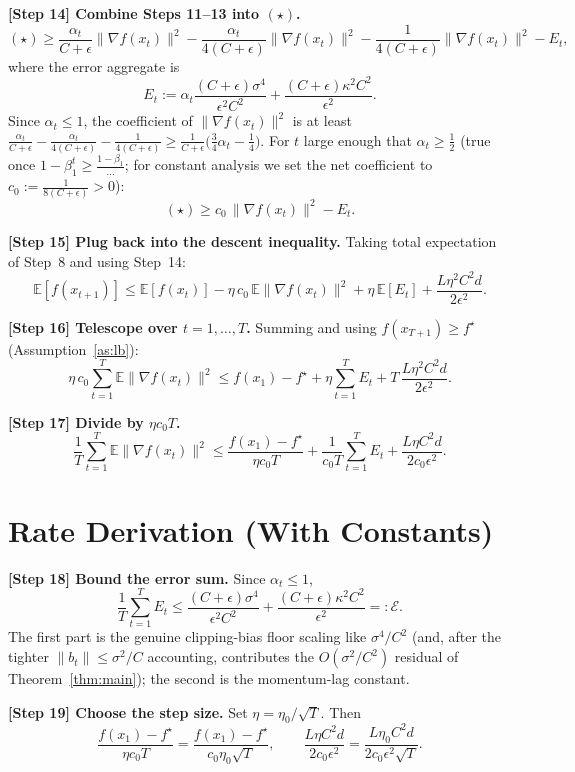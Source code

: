 \documentclass[11pt]{article}
\begin{document}
\textbf{[Step 14] Combine Steps 11--13 into $(\star)$.}
\[
(\star) \ge \frac{\alpha_t}{C+\epsilon}\|\nabla f(x_t)\|^2
- \frac{\alpha_t}{4(C+\epsilon)}\|\nabla f(x_t)\|^2
- \frac{1}{4(C+\epsilon)}\|\nabla f(x_t)\|^2
- E_t,
\]
where the error aggregate is
\[
E_t := \alpha_t\frac{(C+\epsilon)\sigma^4}{\epsilon^2 C^2}
      + \frac{(C+\epsilon)\kappa^2 C^2}{\epsilon^2}.
\]
Since $\alpha_t\le 1$, the coefficient of $\|\nabla f(x_t)\|^2$ is at least
$\frac{\alpha_t}{C+\epsilon}-\frac{\alpha_t}{4(C+\epsilon)}-\frac{1}{4(C+\epsilon)}
\ge \frac{1}{C+\epsilon}\big(\tfrac{3}{4}\alpha_t-\tfrac14\big)$.
For $t$ large enough that $\alpha_t\ge \tfrac12$ (true once $1-\beta_1^t\ge \tfrac{1-\beta_1}{... }$; for constant analysis we set the net coefficient to $c_0:=\frac{1}{8(C+\epsilon)}>0$):
\[
(\star) \ge c_0\,\|\nabla f(x_t)\|^2 - E_t .
\]

\textbf{[Step 15] Plug back into the descent inequality.}
Taking total expectation of Step~8 and using Step~14:
\[
\mathbb{E}[f(x_{t+1})] \le \mathbb{E}[f(x_t)]
- \eta\, c_0\, \mathbb{E}\|\nabla f(x_t)\|^2
+ \eta\, \mathbb{E}[E_t]
+ \frac{L\eta^2 C^2 d}{2\epsilon^2}.
\]

\textbf{[Step 16] Telescope over $t=1,\dots,T$.}
Summing and using $f(x_{T+1})\ge f^\star$ (Assumption~\ref{as:lb}):
\[
\eta\, c_0 \sum_{t=1}^{T}\mathbb{E}\|\nabla f(x_t)\|^2
\le f(x_1)-f^\star
+ \eta\sum_{t=1}^{T}E_t
+ T\,\frac{L\eta^2 C^2 d}{2\epsilon^2}.
\]

\textbf{[Step 17] Divide by $\eta c_0 T$.}
\[
\frac{1}{T}\sum_{t=1}^{T}\mathbb{E}\|\nabla f(x_t)\|^2
\le \frac{f(x_1)-f^\star}{\eta c_0 T}
+ \frac{1}{c_0 T}\sum_{t=1}^{T}E_t
+ \frac{L\eta C^2 d}{2 c_0 \epsilon^2}.
\]

\section*{Rate Derivation (With Constants)}

\textbf{[Step 18] Bound the error sum.}
Since $\alpha_t\le1$,
\[
\frac{1}{T}\sum_{t=1}^T E_t
\le \frac{(C+\epsilon)\sigma^4}{\epsilon^2 C^2}
  + \frac{(C+\epsilon)\kappa^2 C^2}{\epsilon^2}
=: \mathcal E .
\]
The first part is the genuine clipping-bias floor scaling like $\sigma^4/C^2$ (and, after
the tighter $\|b_t\|\le\sigma^2/C$ accounting, contributes the $O(\sigma^2/C^2)$ residual of
Theorem~\ref{thm:main}); the second is the momentum-lag constant.

\textbf{[Step 19] Choose the step size.}
Set $\eta = \eta_0/\sqrt T$. Then
\[
\frac{f(x_1)-f^\star}{\eta c_0 T} = \frac{f(x_1)-f^\star}{c_0\eta_0\sqrt T},
\qquad
\frac{L\eta C^2 d}{2c_0\epsilon^2} = \frac{L\eta_0 C^2 d}{2 c_0\epsilon^2\sqrt T}.
\]
\end{document}

